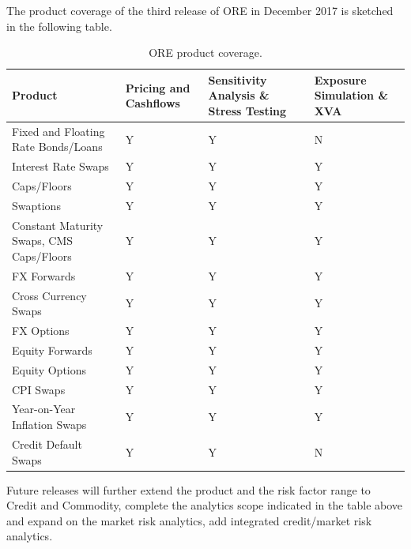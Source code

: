 \documentclass[12pt, a4paper]{article}
\begin{document}
\medskip 
The product coverage of the third release of ORE in December 2017 is sketched in the following table.
\begin{table}[hbt]
\scriptsize
\begin{center}
\begin{tabular}{|l|p{1.5cm}|p{2.6cm}|p{1.5cm}|}
\hline
Product & Pricing and Cashflows & Sensitivity Analysis \& Stress Testing & Exposure Simulation \& XVA\\
\hline
Fixed and Floating Rate Bonds/Loans & Y & Y & N \\
\hline
Interest Rate Swaps & Y & Y & Y \\
\hline
Caps/Floors & Y & Y & Y \\
\hline
Swaptions & Y & Y & Y \\
\hline
Constant Maturity Swaps, CMS Caps/Floors & Y & Y & Y \\
\hline
FX Forwards & Y & Y & Y \\
\hline
Cross Currency Swaps & Y & Y & Y \\
\hline
FX Options & Y & Y & Y \\
\hline
Equity Forwards & Y & Y & Y \\
\hline
Equity Options & Y & Y & Y \\
\hline
CPI Swaps & Y & Y & Y \\
\hline
Year-on-Year Inflation Swaps & Y & Y & Y \\
\hline
Credit Default Swaps & Y & Y & N \\
\hline
\end{tabular}
\caption{ORE product coverage.}
\label{tab_coverage}
\end{center}
\end{table}

Future releases will further extend the product and the risk factor range to Credit and Commodity, complete the analytics scope indicated in the table above and expand on the market risk analytics, add integrated credit/market risk analytics. 
\end{document}
